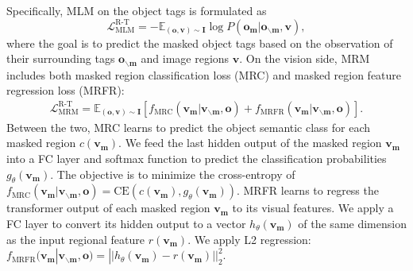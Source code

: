 Specifically, MLM on the object tags is formulated as
\begin{equation*}
    \mathcal{L}_{\text{MLM}}^{\text{R-T}} = - \mathbb{E}_{(\mathbf o, \mathbf v)\sim \mathbf I} \log{P(\mathbf o_{\mathbf m} |\mathbf o_{\backslash \mathbf m}, \mathbf v)},
\end{equation*}
where the goal is to predict the masked object tags based on the observation of their surrounding tags $\mathbf o_{\backslash \mathbf m}$ and image regions $\mathbf v$.
On the vision side, MRM includes both masked region classification loss (MRC) and masked region feature regression loss (MRFR):
\begin{equation*}
    \begin{split}
    \mathcal{L}_{\text{MRM}}^{\text{R-T}} = \mathbb{E}_{(\mathbf o, \mathbf v)\sim \mathbf I}  [f_{\text{MRC}}(\mathbf v_{\mathbf m} | \mathbf v_{\backslash \mathbf m}, \mathbf o) + f_{\text{MRFR}}(\mathbf v_{\mathbf m} | \mathbf v_{\backslash \mathbf m}, \mathbf o) ].
    \end{split}
\end{equation*}
Between the two, MRC learns to predict the object semantic class for each masked region  $c(\mathbf v_{\mathbf m})$.
We feed the last hidden output of the masked region $\mathbf v_{\mathbf m}$ into a FC layer and softmax function to predict the classification probabilities $g_{\theta} ( \mathbf v_{\mathbf m} )$.
The objective is to minimize the cross-entropy of
$ f_{\text{MRC}}(\mathbf v_{\mathbf m} | \mathbf v_{\backslash \mathbf m}, \mathbf o) = \mbox{CE}( c(\mathbf v_{\mathbf m}) , g_{\theta} ( \mathbf v_{\mathbf m} ) ) $.
MRFR learns to regress the transformer output of each masked region $\mathbf v_{\mathbf m}$ to its visual features. 
We apply a FC layer to convert its hidden output to a vector $h_\theta (\mathbf v_{\mathbf m})$ of the same dimension as the input regional feature $r(\mathbf v_{\mathbf m})$.
We apply L2 regression:
$f_{\text{MRFR}}(\mathbf v_{\mathbf m} | \mathbf v_{\backslash \mathbf m}, \mathbf o)  = || h_\theta (\mathbf v_{\mathbf m}) - r(\mathbf v_{\mathbf m}) ||^2_2$.

